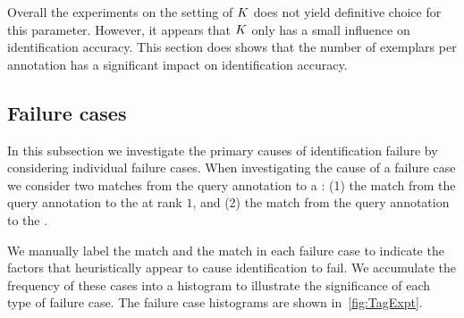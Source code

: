 

        Overall the experiments on the setting of $K$ does not yield definitive choice for this parameter.
        However, it appears that $K$ only has a small influence on identification accuracy.
        This section does shows that the number of exemplars per annotation has a significant impact on
          identification accuracy.

    \subsection{Failure cases}\label{sub:exptfail}  
        
        In this subsection we investigate the primary causes of identification failure by considering individual
          failure cases.
        When investigating the cause of a failure case we consider two matches from the query annotation to a
          \name{}:
        (1) the match from the query annotation to the \groundfalse{} \name{} at rank $1$, and
        (2) the match from the query annotation to the \groundtrue{} \name{}.

        We manually label the \groundtrue{} match and the \groundfalse{} match in each failure case to indicate
          the factors that heuristically appear to cause identification to fail.
        We accumulate the frequency of these cases into a histogram to illustrate the significance of each type
          of failure case.
        The failure case histograms are shown in~\cref{fig:TagExpt}.

